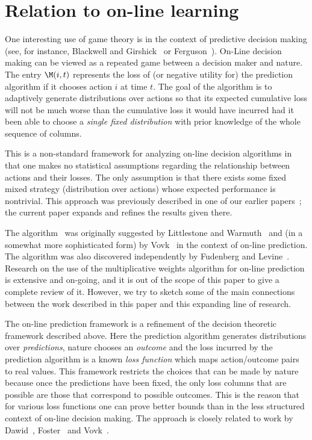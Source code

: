 \section{Relation to on-line learning} \label{sec:online}

One interesting use of game theory is in the context of predictive
decision making (see, for instance, Blackwell and
Girshick~\cite{BlackwellGi54} or Ferguson~\cite{Ferguson67}).
On-Line decision making can be viewed as a repeated
game between a decision maker and nature.
The entry $\M(i,t)$ represents the loss of (or negative utility for)
the prediction
algorithm if it chooses action $i$ at time $t$.  The goal of the
algorithm is to adaptively generate distributions over actions so
that its expected cumulative loss will not be much worse than the
cumulative loss it would have incurred had it been able to choose a
{\em single fixed distribution} with prior knowledge of the whole
sequence of columns.

This is a non-standard framework for analyzing on-line decision
algorithms in that one makes no statistical
assumptions regarding the relationship between actions and their
losses. The only assumption is that there exists some fixed mixed strategy
(distribution over actions) whose expected performance is nontrivial.
{This approach was previously described in one of our earlier
papers~\cite{FreundSc96b}; the
current paper expands and refines the results given there.}

The algorithm \lwalg\ was originally suggested by
Littlestone and Warmuth~\cite{LittlestoneWa94} and (in a somewhat more
sophisticated form) by Vovk~\cite{Vovk90} in the context of on-line
prediction.
The algorithm was also discovered independently by Fudenberg and
Levine~\cite{FudenbergLe95}.
Research on the use of the multiplicative weights
algorithm for on-line prediction is extensive and on-going, and it is
out of the scope of this paper to give a complete review of
it. However, we try to sketch some of the main connections between the
work described in this paper and this expanding line of research.

The on-line prediction framework is a refinement of the decision
theoretic framework described above. Here the prediction algorithm
generates distributions over {\em predictions}, nature chooses an {\em
outcome} and the loss incurred by the prediction algorithm is a known
{\em loss function} which maps action/outcome pairs to real values.
This framework restricts the choices that can be made by nature
because once the predictions have been fixed, the only loss columns
that are possible are those that correspond to possible outcomes.
This is the reason that for various loss functions one can prove
better bounds than in the less structured context of on-line decision
making.
The approach is closely related to work by Dawid~\cite{Dawid84},
Foster~\cite{Foster91} and Vovk~\cite{Vovk90}.


